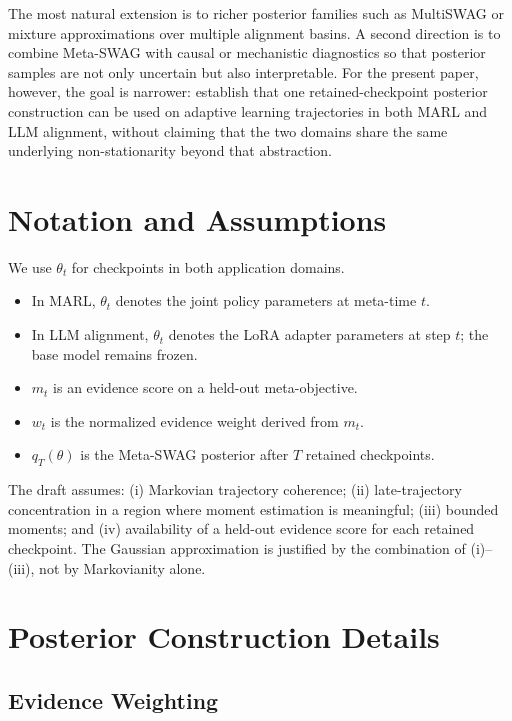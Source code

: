 \documentclass[10pt]{article}
\theoremstyle{plain}
\theoremstyle{definition}
\theoremstyle{remark}
\begin{document}
The most natural extension is to richer posterior families such as MultiSWAG or mixture approximations over multiple alignment basins. A second direction is to combine Meta-SWAG with causal or mechanistic diagnostics so that posterior samples are not only uncertain but also interpretable. For the present paper, however, the goal is narrower: establish that one retained-checkpoint posterior construction can be used on adaptive learning trajectories in both MARL and LLM alignment, without claiming that the two domains share the same underlying non-stationarity beyond that abstraction.

\appendix

\section{Notation and Assumptions}

We use $\theta_t$ for checkpoints in both application domains.
\begin{itemize}[leftmargin=1.5em]
  \item In MARL, $\theta_t$ denotes the joint policy parameters at meta-time $t$.
  \item In LLM alignment, $\theta_t$ denotes the LoRA adapter parameters at step $t$; the base model remains frozen.
  \item $m_t$ is an evidence score on a held-out meta-objective.
  \item $w_t$ is the normalized evidence weight derived from $m_t$.
  \item $q_T(\theta)$ is the Meta-SWAG posterior after $T$ retained checkpoints.
\end{itemize}

The draft assumes: (i) Markovian trajectory coherence; (ii) late-trajectory concentration in a region where moment estimation is meaningful; (iii) bounded moments; and (iv) availability of a held-out evidence score for each retained checkpoint. The Gaussian approximation is justified by the combination of (i)--(iii), not by Markovianity alone.

\section{Posterior Construction Details}

\subsection{Evidence Weighting}
\end{document}
